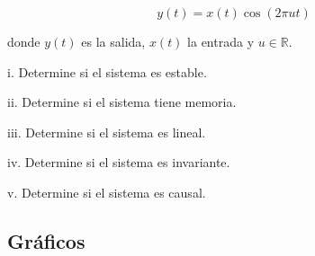 \documentclass[letterpaper, 12pt]{article}
\newif\ifanswers
\begin{document}
\begin{enumerate}
    $$
    y(t)=x(t) \cos (2 \pi u t)
    $$
    
    donde $y(t)$ es la salida, $x(t)$ la entrada y $u \in \mathbb{R}$.
    
    i. Determine si el sistema es estable.
    
    ii. Determine si el sistema tiene memoria.
    
    iii. Determine si el sistema es lineal.
    
    iv. Determine si el sistema es invariante.
    
    v. Determine si el sistema es causal.

    \ifanswers
    {\color{red}
    \textbf{Solución: }

    i. Si la entrada $x(t)$ es acotada, como $|\cos (2 \pi u t)| \leq 1$ entonces la salida estará acotada, como máximo, al mismo valor de la entrada. Por lo tanto el sistema es estable .
    
    ii. Dado que $y(t)$ solo depende del valor presente de $t$, el sistema no tiene memoria .
    
    iii. Homogeneidad:
    
    $$
    \alpha x(t) \rightarrow \alpha x(t) \cos (2 \pi u t)=\alpha y(t)
    $$
    
    Superposición:
    
    $$
    x_{1}(t)+x_{2}(t) \rightarrow\left(x_{1}(t)+x_{2}(t)\right) \cos (2 \pi u t)=x_{1}(t) \cos (2 \pi u t)+x_{2}(t) \cos (2 \pi u t)=y_{1}(t)+y_{2}(t)
    $$
    
    Por lo tanto, el sistema es lineal .
    
    iv. Invariancia:
    
    $$
    x(t-\tau) \rightarrow x(t-\tau) \cos (2 \pi u t)
    $$
    
    Pero la salida desfasada es
    
    $$
    y(t-\tau)=x(t-\tau) \cos (2 \pi u(t-\tau))
    $$
    
    Como ambas expresiones no son iguales, el sistema es variante.
    
    v. Como el sistema no depende de valores futuros de la entrada el sistema es causal .
    
    Por ejemplo, para el tiempo $t=1$, entonces
    
    $y(1)=x(1) \cos (2 \pi u 1)$.
    
    }
    \fi
\end{enumerate}


\subsection*{Gráficos}
\end{document}
